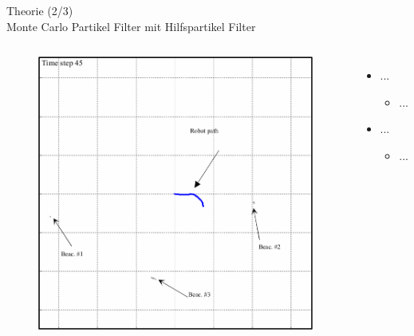 \documentclass{beamer}
\begin{document}
\begin{frame}{Theorie (2/3)\\Monte Carlo Partikel Filter mit Hilfspartikel Filter}
\begin{columns}
\begin{overlayarea}{\textwidth}{.9\textheight}
{\begin{figure}
						\caption{\cite{blanco2008pure}}
					\end{figure}
				}
				{
					\begin{figure}
						\centering
						\includegraphics[width=\linewidth]{blanco2008pure_fig3h}
						\caption{\cite{blanco2008pure}}
					\end{figure}
				}
			\end{overlayarea}		
			\begin{itemize}
				\item ...
					\begin{itemize}
						\item ...
					\end{itemize}
				\item ...
					\begin{itemize}
						\item ...
					\end{itemize}
			\end{itemize}
	\end{columns}
\end{frame}
\end{document}
